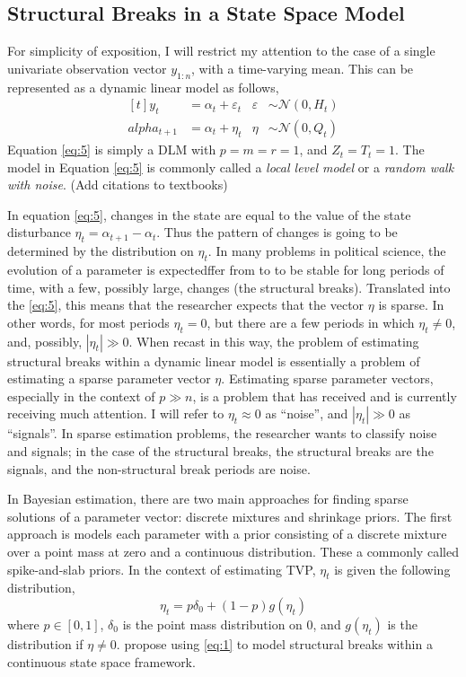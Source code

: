 \documentclass{article}
\newcommand{\paren}[1]{\ensuremath{\left(#1\right)}}
\newcommand{\dnorm}[1]{\ensuremath{\mathcal{N}\paren{#1}}}
\begin{document}
\subsection{Structural Breaks in a State Space Model}
\label{sec:struct-breaks-state}

For simplicity of exposition, I will restrict my attention to the case of a single univariate observation vector $y_{1:n}$, with a time-varying mean.
This can be represented as a dynamic linear model as follows,
\begin{equation}
  \label{eq:5}
  \begin{aligned}[t]
    y_{t} &= \alpha_{t} + \varepsilon_{t} & \varepsilon & \sim \dnorm{0, H_{t}} \\
    alpha_{t + 1} &= \alpha_{t} + \eta_{t} & \eta & \sim \dnorm{0, Q_{t}}
  \end{aligned}
\end{equation}
Equation \eqref{eq:5} is simply a DLM with $p = m = r = 1$, and $Z_{t} = T_{t} = 1$.
The model in Equation \eqref{eq:5} is commonly called a \textit{local level model} or a \textit{random walk with noise}. (Add citations to textbooks)

In equation \eqref{eq:5}, changes in the state are equal to the value of the state disturbance $\eta_{t} = \alpha_{t+1} - \alpha_{t}$. 
Thus the pattern of changes is going to be determined by the distribution on $\eta_{t}$.
In many problems in political science, the evolution of a parameter is expectedffer from to to be stable for long periods of time, with a few, possibly large, changes (the structural breaks).
Translated into the \eqref{eq:5}, this means that the researcher expects that the vector $\eta$ is sparse. 
In other words, for most periods $\eta_{t} = 0$, but there are a few periods in which $\eta_{t} \neq 0$, and, possibly,  $|\eta_{t}| \gg 0$.
When recast in this way, the problem of estimating structural breaks within a dynamic linear model is essentially a problem of estimating a sparse parameter vector $\eta$.
Estimating sparse parameter vectors, especially in the context of $p \gg n$, is a problem that has received and is currently receiving much attention.
I will refer to $\eta_{t} \approx 0$ as ``noise'', and $|\eta_{t}| \gg 0$ as ``signals''. 
In sparse estimation problems, the researcher wants to classify noise and signals; in the case of the structural breaks, the structural breaks are the signals, and the non-structural break periods are noise.

In Bayesian estimation, there are two main approaches for finding sparse solutions of a parameter vector: discrete mixtures and shrinkage priors.
The first approach is models each parameter with a prior consisting of a discrete mixture over a point mass at zero and a continuous distribution.
These a commonly called spike-and-slab priors.
In the context of estimating TVP, $\eta_{t}$ is given the following distribution,
\begin{equation}
  \label{eq:1}
  \eta_{t} = p \delta_{0} +  (1 - p) g(\eta_{t})
\end{equation}
where $p \in [0, 1]$, $\delta_{0}$ is the point mass distribution on 0, and $g(\eta_{t})$ is the distribution if $\eta \neq 0$.
\textcite{GiordaniKohn2008} propose using \eqref{eq:1} to model structural breaks within a continuous state space framework.
\end{document}
